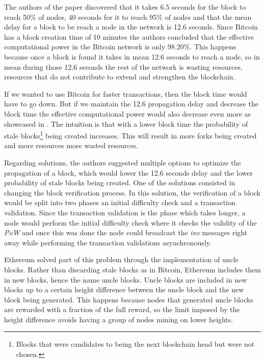 The authors of the paper discovered that it takes 6.5 seconds for the block to reach 50\% of nodes, 40 seconds for it to reach 95\% of nodes and that the mean delay for a block to be reach a node in the network is 12.6 seconds. Since Bitcoin has a block creation time of 10 minutes the authors concluded that the effective computational power in the Bitcoin network is only 98.20\%. This happens because once a block is found it takes in mean 12.6 seconds to reach a node, so in mean during those 12.6 seconds the rest of the network is wasting resources, resources that do not contribute to extend and strengthen the blockchain.

If we wanted to use Bitcoin for faster transactions, then the block time would have to go down. But if we maintain the 12.6 propagation delay and decrease the block time the effective computational power would also decrease even more as showcased in \cite{ethereumblog}. The intuition is that with a lower block time the probability of stale blocks\footnote{Blocks that were candidates to being the next blockchain head but were not chosen.} being created increases. This will result in more forks being created and more resources more wasted resources.

Regarding solutions, the authors suggested multiple options to optimize the propagation of a block, which would lower the 12.6 seconds delay and the lower probability of stale blocks being created. One of the solutions consisted in changing the block verification process. In this solution, the verification of a block would be split into two phases an initial difficulty check and a transaction validation. Since the transaction validation is the phase which takes longer, a node would perform the initial difficulty check where it checks the validity of the \textit{PoW} and once this was done the node could broadcast the \textit{inv} messages right away while performing the transaction validations asynchronously.

Ethereum solved part of this problem through the implementation of uncle blocks. Rather than discarding stale blocks as in Bitcoin, Ethereum includes them in new blocks, hence the name uncle blocks. Uncle blocks are included in new blocks up to a certain height difference between the uncle block and the new block being generated. This happens because nodes that generated uncle blocks are rewarded with a fraction of the full reward, so the limit imposed by the height difference avoids having a group of nodes mining on lower heights.

